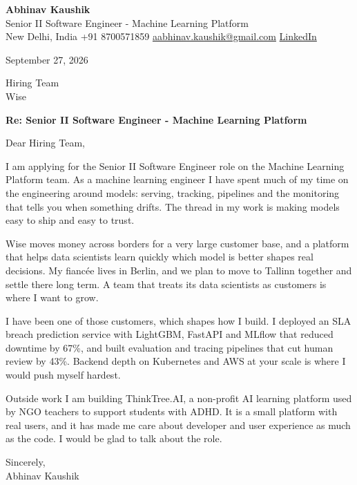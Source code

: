 \documentclass[11pt,a4paper]{article}
\begin{document}
{\Large\bfseries Abhinav Kaushik}\\
Senior II Software Engineer - Machine Learning Platform\\
New Delhi, India \textbar{} +91 8700571859 \textbar{} \href{mailto:aabhinav.kaushik@gmail.com}{aabhinav.kaushik@gmail.com} \textbar{} \href{https://www.linkedin.com/in/abhinav-kaushik10/}{LinkedIn}  

September 27, 2026

Hiring Team\\
Wise

\textbf{Re: Senior II Software Engineer - Machine Learning Platform}

Dear Hiring Team,

I am applying for the Senior II Software Engineer role on the Machine Learning Platform team. As a machine learning engineer I have spent much of my time on the engineering around models: serving, tracking, pipelines and the monitoring that tells you when something drifts. The thread in my work is making models easy to ship and easy to trust.

Wise moves money across borders for a very large customer base, and a platform that helps data scientists learn quickly which model is better shapes real decisions. My fiancée lives in Berlin, and we plan to move to Tallinn together and settle there long term. A team that treats its data scientists as customers is where I want to grow.

I have been one of those customers, which shapes how I build. I deployed an SLA breach prediction service with LightGBM, FastAPI and MLflow that reduced downtime by 67\%, and built evaluation and tracing pipelines that cut human review by 43\%. Backend depth on Kubernetes and AWS at your scale is where I would push myself hardest.

Outside work I am building ThinkTree.AI, a non-profit AI learning platform used by NGO teachers to support students with ADHD. It is a small platform with real users, and it has made me care about developer and user experience as much as the code. I would be glad to talk about the role.

Sincerely,\\[4pt]
Abhinav Kaushik
\end{document}
